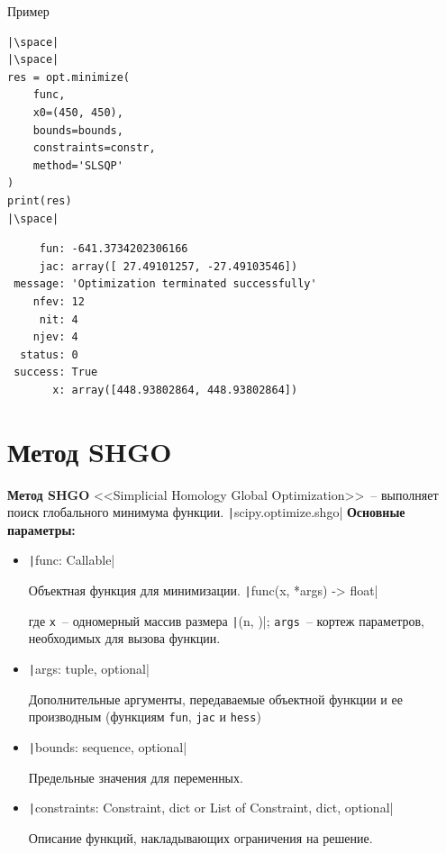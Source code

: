 \documentclass[aspectratio=169, mathserif]{beamer}%
\begin{document}
\begin{frame}[fragile, label=c]{Пример}
\scriptsize
\begin{verbatim}
|\space|
|\space|
res = opt.minimize(
    func,
    x0=(450, 450),
    bounds=bounds,
    constraints=constr,
    method='SLSQP'
)
print(res)
|\space|
\end{verbatim}
\vfill
\begin{verbatim}
     fun: -641.3734202306166
     jac: array([ 27.49101257, -27.49103546])
 message: 'Optimization terminated successfully'
    nfev: 12
     nit: 4
    njev: 4
  status: 0
 success: True
       x: array([448.93802864, 448.93802864])
\end{verbatim}
\vfill
\end{frame}


\section{Метод SHGO}
\begin{frame}[fragile, label=c]{\textbf{Метод SHGO}}
\scriptsize
<<Simplicial Homology Global Optimization>>~-- выполняет поиск глобального минимума функции.
\texttt|scipy.optimize.shgo|
\vfill
\textcolor{tpugreen}{\textbf{Основные параметры:}}
\vfill
\begin{itemize}
\item[] \texttt|func: Callable|

Объектная функция для минимизации.
\vfill
\texttt|func(x, *args) -> float|

где \texttt{x}~-- одномерный массив размера \texttt|(n, )|; \texttt{args}~-- кортеж параметров, необходимых для вызова функции.
\vfill
\item[] \texttt|args: tuple, optional|

Дополнительные аргументы, передаваемые объектной функции и ее производным (функциям \texttt{fun}, \texttt{jac} и \texttt{hess})
\vfill
\item[] \texttt|bounds: sequence, optional|

Предельные значения для переменных.
\vfill
\item[] \texttt|constraints: {Constraint, dict} or List of {Constraint, dict}, optional|

Описание функций, накладывающих ограничения на решение.
\end{itemize}
\vfill
\end{frame}
\end{document}
